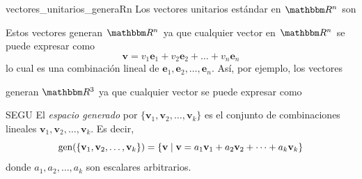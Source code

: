 \begin{examplebox}{}{vectores_unitarios_generaRn}
    Los vectores unitarios estándar en $\RR[n]$ son
    \begin{matrizn}
    \end{matrizn}
    Estos vectores generan $\RR[n]$ ya que cualquier vector en $\RR[n]$ se puede expresar como
    $$\mathbf{v} = v_1 \mathbf{e}_1 + v_2 \mathbf{e}_2 + \dots + v_n \mathbf{e}_n$$
    lo cual es una combinación lineal de $\mathbf{e}_1, \mathbf{e}_2, \dots, \mathbf{e}_n$. Así, por ejemplo, los vectores
    \begin{matrizn}
    \end{matrizn}
    generan $\RR[3]$ ya que cualquier vector se puede expresar como
    \begin{matrizn}
    \end{matrizn}
\end{examplebox}

\begin{definicion}{}{SEGU}
    El \emph{espacio generado} por $\{\mathbf{v}_1, \mathbf{v}_2, \dots, \mathbf{v}_k\}$ es el conjunto de combinaciones lineales $\mathbf{v}_1, \mathbf{v}_2, \dots, \mathbf{v}_k$. Es decir,
    $$\operatorname{gen} (\{\mathbf{v}_1, \mathbf{v}_2, \dots, \mathbf{v}_k\}) = \{\mathbf{v} \mid \mathbf{v} = a_1\mathbf{v}_1 + a_2\mathbf{v}_2 + \dots + a_k\mathbf{v}_k\}$$
    donde $a_1, a_2, \dots, a_k$ son escalares arbitrarios.
\end{definicion}

